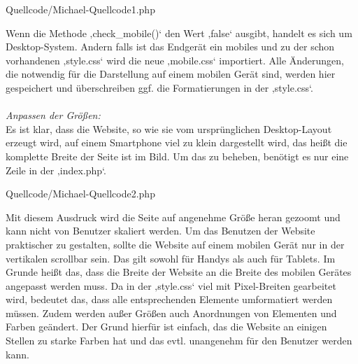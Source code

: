 \newpage
\begin{center}
	\begin{lstinputlisting}[language=PHP, caption={Unterscheidung Desktop und mobiles Gerät}]
		{Quellcode/Michael-Quellcode1.php}
	\end{lstinputlisting}
\end{center}

Wenn die Methode ‚check\_mobile()‘ den Wert ‚false‘ ausgibt, handelt es sich um Desktop-System. Andern falls ist das Endgerät ein mobiles und zu der schon vorhandenen ‚style.css‘ wird die neue ‚mobile.css‘ importiert. Alle Änderungen, die notwendig für die Darstellung auf einem mobilen Gerät sind, werden hier gespeichert und überschreiben ggf. die Formatierungen in der ‚style.css‘.
\\ \\
\textit{Anpassen der Größen:}
\\
Es ist klar, dass die Website, so wie sie  vom ursprünglichen Desktop-Layout erzeugt wird, auf einem Smartphone viel zu klein dargestellt wird, das heißt die komplette Breite der Seite ist im Bild. Um das zu beheben, benötigt es nur eine Zeile in der ‚index.php‘.

\begin{center}
	\begin{lstinputlisting}[language=PHP, caption={Auszug aus der Index-Datei}]
		{Quellcode/Michael-Quellcode2.php}
	\end{lstinputlisting}
\end{center}

Mit diesem Ausdruck wird die Seite auf angenehme Größe heran gezoomt und kann nicht von Benutzer skaliert werden. 
Um das Benutzen der Website praktischer zu gestalten, sollte die Website auf einem mobilen Gerät nur in der vertikalen scrollbar sein. Das gilt sowohl für Handys als auch für Tablets. Im Grunde heißt das, dass die Breite der Website an die Breite des mobilen Gerätes angepasst werden muss. Da in der ‚style.css‘ viel mit Pixel-Breiten gearbeitet wird, bedeutet das, dass alle entsprechenden Elemente umformatiert werden müssen.
Zudem werden außer Größen auch Anordnungen von Elementen und Farben geändert. Der Grund hierfür ist einfach, das die Website an einigen Stellen zu starke Farben hat und das evtl. unangenehm für den Benutzer werden kann. 



